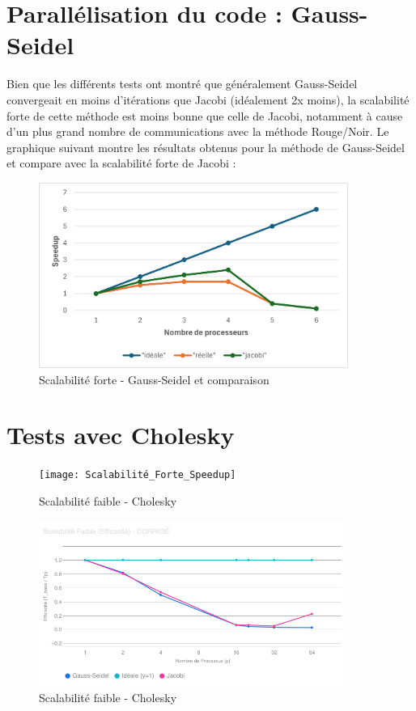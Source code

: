 \documentclass{article}
\begin{document}
\section{Parallélisation du code : Gauss-Seidel}

Bien que les différents tests ont montré que généralement Gauss-Seidel convergeait en moins d'itérations que Jacobi (idéalement 2x moins), la scalabilité forte de cette méthode est moins bonne que celle de Jacobi, notamment à cause d'un plus grand nombre de communications avec la méthode Rouge/Noir. Le graphique suivant montre les résultats obtenus pour la méthode de Gauss-Seidel et compare avec la scalabilité forte de Jacobi :

\begin{figure}[H]
    \centering
    \includegraphics[width=0.9\textwidth]{strong_scaling_gs.png}
    \caption{Scalabilité forte - Gauss-Seidel et comparaison}
    \label{fig:strongGS}
\end{figure}

\section{Tests avec Cholesky}

\begin{figure}[H]
    \centering
    \texttt{[image: Scalabilité\_Forte\_Speedup]}
    \caption{Scalabilité faible - Cholesky}
    \label{fig:strongCholesky}
\end{figure}

\begin{figure}[H]
    \centering
    \includegraphics[width=0.9\textwidth]{Scalabilité_Faible_Efficacité}
    \caption{Scalabilité faible - Cholesky}
    \label{fig:weakCholesky}
\end{figure}
\end{document}
